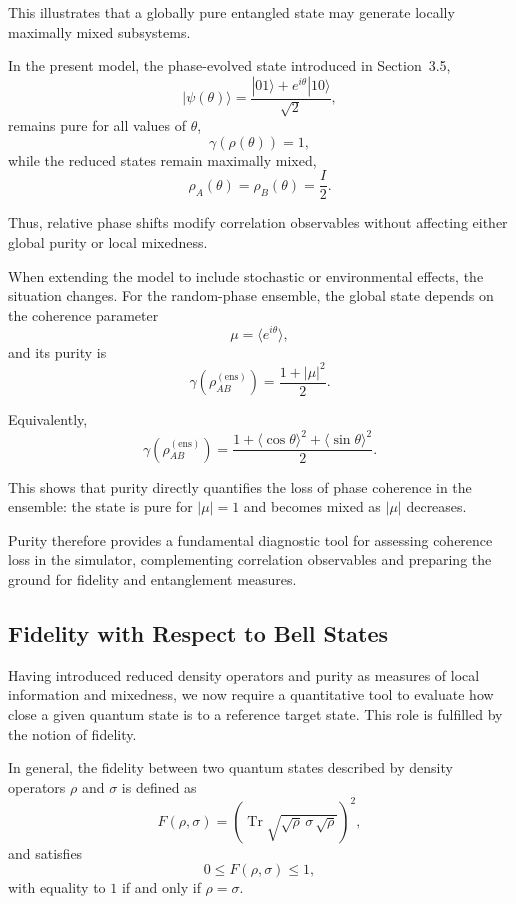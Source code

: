 \documentclass[a4paper]{article}
\begin{document}
This illustrates that a globally pure entangled state may generate locally maximally mixed subsystems.

\medskip

In the present model, the phase-evolved state introduced in Section~3.5,
\[
|\psi(\theta)\rangle = \frac{|01\rangle + e^{i\theta}|10\rangle}{\sqrt{2}},
\]
remains pure for all values of \( \theta \),
\[
\gamma(\rho(\theta)) = 1,
\]
while the reduced states remain maximally mixed,
\[
\rho_A(\theta) = \rho_B(\theta) = \frac{I}{2}.
\]

Thus, relative phase shifts modify correlation observables without affecting either global purity or local mixedness.

\medskip

When extending the model to include stochastic or environmental effects, the situation changes. For the random-phase ensemble, the global state depends on the coherence parameter
\[
\mu = \langle e^{i\theta} \rangle,
\]
and its purity is
\[
\gamma\!\left(\rho_{AB}^{(\mathrm{ens})}\right)
=
\frac{1 + |\mu|^2}{2}.
\]

Equivalently,
\[
\gamma\!\left(\rho_{AB}^{(\mathrm{ens})}\right)
=
\frac{1 + \langle \cos\theta \rangle^2 + \langle \sin\theta \rangle^2}{2}.
\]

This shows that purity directly quantifies the loss of phase coherence in the ensemble: the state is pure for \( |\mu| = 1 \) and becomes mixed as \( |\mu| \) decreases.

\medskip

Purity therefore provides a fundamental diagnostic tool for assessing coherence loss in the simulator, complementing correlation observables and preparing the ground for fidelity and entanglement measures.


\subsection{Fidelity with Respect to Bell States}

Having introduced reduced density operators and purity as measures of local information and mixedness, we now require a quantitative tool to evaluate how close a given quantum state is to a reference target state. This role is fulfilled by the notion of fidelity.

In general, the fidelity between two quantum states described by density operators \( \rho \) and \( \sigma \) is defined as
\[
F(\rho,\sigma)
=
\left(\operatorname{Tr}\sqrt{\sqrt{\rho}\,\sigma\,\sqrt{\rho}}\right)^2,
\]
and satisfies
\[
0 \le F(\rho,\sigma) \le 1,
\]
with equality to \(1\) if and only if \( \rho = \sigma \).
\end{document}
